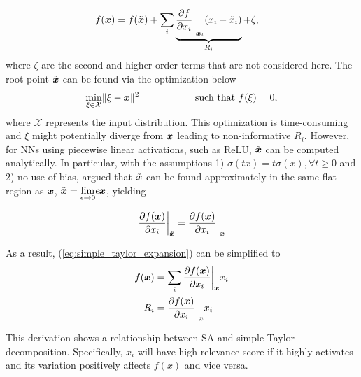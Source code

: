 \begin{align} \label{eq:simple_taylor_expansion}
	f(\patvector{x}) 	&= f(\tilde{\patvector{x}}) + \sum_{i} \underbrace{\frac{\partial f }{ \partial x_i } \Bigg|_{\tilde{\patvector{x}}_i}  ( x_i - \tilde{x}_i ) }_{R_i} + \zeta, 
\end{align}
where $\zeta$ are the second and higher order terms that are not considered here. The root point $\tilde{\boldsymbol{x}}$ can be found via the optimization below 
\begin{align*}
\underset{\xi \in \mathcal{X} }{\text{min}}  \| \xi - \patvector{x} \|^2 \hspace{2cm}  \text{such that}\  f(\xi) = 0,
\end{align*}
where $\mathcal{X}$ represents the input distribution. This optimization is time-consuming  and $\xi$ might potentially diverge from $\patvector{x}$ leading to non-informative $R_i$. However, for NNs using piecewise linear activations, such as ReLU,  $\tilde{\boldsymbol{x}}$ can be computed analytically. In particular, with the assumptions 1) $\sigma(tx) = t\sigma(x) ,\forall t \ge 0$ and 2) no use of bias, \citet{MontavonMethodsinterpretingunderstanding2018} argued that $\tilde{\patvector{x}}$ can be found approximately in the same flat region as $\patvector{x}$, $\tilde{\patvector{x}} = \underset{\epsilon \rightarrow 0 }{\lim} \epsilon \patvector{x}$, yielding

\begin{align*}
	\frac{\partial f(\patvector{x})}{\partial x_i}\bigg|_{{\tilde{\patvector{x}}}} = \frac{\partial f(\patvector{x})}{\partial x_i}\bigg|_{\patvector{x}} 
\end{align*}

%
As a result, (\ref{eq:simple_taylor_expansion}) can be simplified to
\begin{align}
	f(\patvector{x}) &= \sum_{i} \frac{\partial f(\patvector{x})}{\partial x_i}\bigg|_{\patvector{x}}  x_i \nonumber \\
	R_i &= \frac{\partial f(\patvector{x})}{\partial x_i}\bigg|_{\patvector{x}}  x_i \label{eq:simple_r_i}
\end{align}

This derivation shows a relationship between SA and simple Taylor decomposition. Specifically, $x_i$ will have high relevance score if it highly activates and its variation positively affects $f(x)$ and vice versa.


